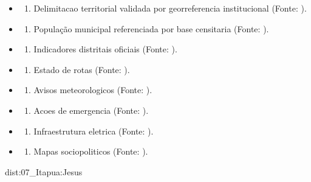 {\begin{itemize}
\tightlist
\item
  \begin{enumerate}
  \def\labelenumi{\arabic{enumi})}
  \tightlist
  \item
    Delimitacao territorial validada por georreferencia institucional
    (Fonte: ).
  \end{enumerate}
\item
  \begin{enumerate}
  \def\labelenumi{\arabic{enumi})}
  \setcounter{enumi}{1}
  \tightlist
  \item
    População municipal referenciada por base censitaria (Fonte: ).
  \end{enumerate}
\item
  \begin{enumerate}
  \def\labelenumi{\arabic{enumi})}
  \setcounter{enumi}{2}
  \tightlist
  \item
    Indicadores distritais oficiais (Fonte: ).
  \end{enumerate}
\item
  \begin{enumerate}
  \def\labelenumi{\arabic{enumi})}
  \setcounter{enumi}{3}
  \tightlist
  \item
    Estado de rotas (Fonte: ).
  \end{enumerate}
\item
  \begin{enumerate}
  \def\labelenumi{\arabic{enumi})}
  \setcounter{enumi}{4}
  \tightlist
  \item
    Avisos meteorologicos (Fonte: ).
  \end{enumerate}
\item
  \begin{enumerate}
  \def\labelenumi{\arabic{enumi})}
  \setcounter{enumi}{5}
  \tightlist
  \item
    Acoes de emergencia (Fonte: ).
  \end{enumerate}
\item
  \begin{enumerate}
  \def\labelenumi{\arabic{enumi})}
  \setcounter{enumi}{6}
  \tightlist
  \item
    Infraestrutura eletrica (Fonte: ).
  \end{enumerate}
\item
  \begin{enumerate}
  \def\labelenumi{\arabic{enumi})}
  \setcounter{enumi}{7}
  \tightlist
  \item
    Mapas sociopoliticos (Fonte: ).
  \end{enumerate}
\end{itemize}}{dist:07_Itapua:Jesus}
